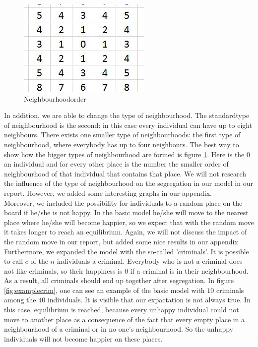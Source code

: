 
\begin{figure}
\vspace{-20pt}
\centering
\includegraphics[scale=0.5]{buurtorde.jpg}
\caption{Neighbourhoodorder}
\vspace{-15pt}
\label{fig:neighbourhood}
\end{figure}

In addition, we are able to change the type of neighbourhood.
The standardtype of neighbourhood is the second: in this case every individual can have up to eight neighbours.
There exists one smaller type of neighbourhoods: the first type of neighbourhood, where everybody has up to four neighbours.
The best way to show how the bigger types of neighbourhood are formed is figure \ref{fig:neighbourhood}.
Here is the $0$ an individual and for every other place is the number the smaller order of neighbourhood of that individual that contains that place.
We will not research the influence of the type of neighbourhood on the segregation in our model in our report.
However, we added some interesting graphs in our appendix.\\

Moreover, we included the possibility for individuals to a random place on the board if he/she is not happy.
In the basic model he/she will move to the nearest place where he/she will become happier, so we expect that with the random move it takes longer to reach an equilibrium.
Again, we will not discuss the impact of the random move in our report, but added some nice results in our appendix.\\

Furthermore, we expanded the model with the so-called 'criminals'.
It is possible to call $c$ of the $n$ individuals a criminal.
Everybody who is not a criminal does not like criminals, so their happiness is $0$ if a criminal is in their neighbourhood.
As a result, all criminals should end up together after segregation.
In figure \ref{fig:examplecrim}, one can see an example of the basic model with $10$ criminals among the $40$ individuals.
It is visible that our expactation is not always true.
In this case, equilibrium is reached, because every unhappy individual could not move to another place as a consequence of the fact that every empty place in a neighbourhood of a criminal or in no one's neighbourhood.
So the unhappy individuals will not become happier on these places.

